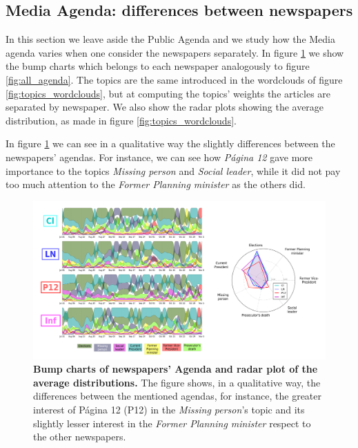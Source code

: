 \subsection{Media Agenda: differences between newspapers}

\par In this section we leave aside the Public Agenda and we study how the Media agenda varies when one consider the newspapers separately. 
In figure \ref{fig:news_agenda} we show the bump charts which belongs to each newspaper analogously to figure \ref{fig:all_agenda}.
The topics are the same introduced in the wordclouds of figure \ref{fig:topics_wordclouds}, but at computing the topics' weights the articles are separated by newspaper. 
We also show the radar plots showing the average distribution, as made in figure \ref{fig:topics_wordclouds}. 
\par In figure \ref{fig:news_agenda} we can see in a qualitative way the slightly differences between the newspapers' agendas.
For instance, we can see how \emph{Página 12} gave more importance to the topics \emph{Missing person} and \emph{Social leader}, while it did not pay too much attention to the \emph{Former Planning minister} as the others did.

\begin{figure}[h]
\centering
\includegraphics[width = \textwidth]{images/Fig5.pdf}
\caption{\textbf{Bump charts of newspapers' Agenda and radar plot of the average distributions.} The figure shows, in a qualitative way, the differences between the mentioned agendas, for instance, the greater interest of Página 12 (P12) in the \emph{Missing person}’s topic and its slightly lesser interest in the \emph{Former Planning minister} respect to the other newspapers.}
\label{fig:news_agenda}
\end{figure}

